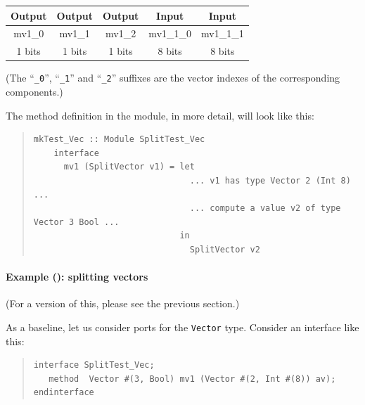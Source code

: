 \begin{center}
  \begin{tabular}{|c|c|c||c|c|}
    \hline
     Output &
     Output &
     Output &
     Input  &
     Input  \\
    \hline
     mv1\_0     &
     mv1\_1     &
     mv1\_2     &
     mv1\_1\_0  &
     mv1\_1\_1  \\
     1  bits   &
     1  bits   &
     1  bits   &
     8  bits   &
     8  bits   \\
    \hline
  \end{tabular}

  {\footnotesize (The ``{\tt \_0}'', ``{\tt \_1}'' and ``{\tt \_2}''
    suffixes are the vector indexes of the corresponding components.)}

\end{center}

The method definition in the module, in more detail, will look like this:

\begin{quote}
\begin{verbatim}
mkTest_Vec :: Module SplitTest_Vec
    interface
      mv1 (SplitVector v1) = let
                               ... v1 has type Vector 2 (Int 8) ...
                               ... compute a value v2 of type Vector 3 Bool ...
                             in
                               SplitVector v2
\end{verbatim}
\end{quote}


\paragraph{Example (\BSV): splitting vectors}

\label{sec:splitports_examples_BSV_vectors}

\hspace*{1em}

{\footnotesize (For a {\BHb} version of this, please see the previous section.)}

As a baseline, let us consider ports for the {\tt Vector} type.
Consider an interface like this:

\begin{quote}
\begin{verbatim}
interface SplitTest_Vec;
   method  Vector #(3, Bool) mv1 (Vector #(2, Int #(8)) av);
endinterface
\end{verbatim}
\end{quote}

